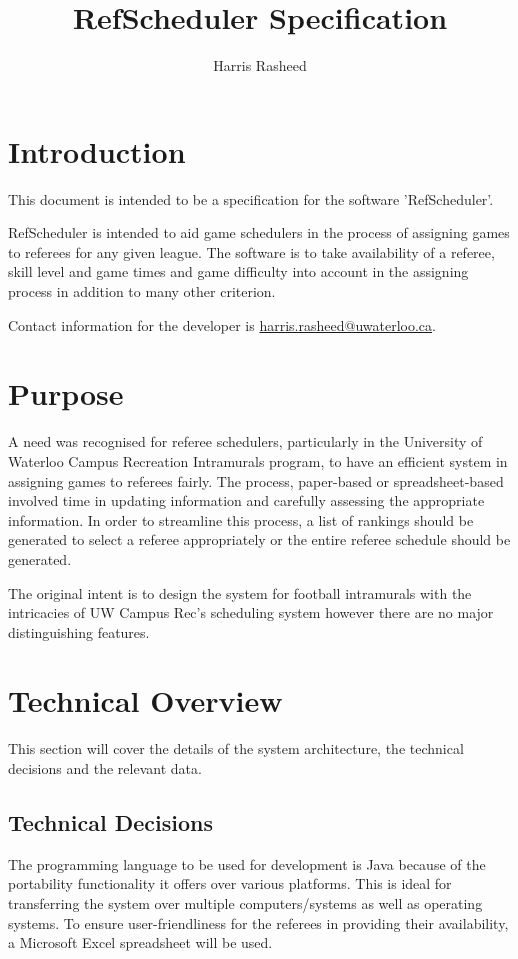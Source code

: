 \documentclass{article}
\begin{document}
\author{Harris Rasheed}
\title{RefScheduler Specification}
\maketitle

\tableofcontents
\pagebreak

\section{Introduction}
This document is intended to be a specification for the software 'RefScheduler'.

RefScheduler is intended to aid game schedulers in the process of assigning games to referees for any given league. The software is to take availability of a referee, skill level and game times and game difficulty into account in the assigning process in addition to many other criterion.

Contact information for the developer is \href{mailto:harris.rasheed@uwaterloo.ca}{harris.rasheed@uwaterloo.ca}.

\section{Purpose}
A need was recognised for referee schedulers, particularly in the University of Waterloo Campus Recreation Intramurals program, to have an efficient system in assigning games to referees fairly. The process, paper-based or spreadsheet-based involved time in updating information and carefully assessing the appropriate information. In order to streamline this process, a list of rankings should be generated to select a referee appropriately or the entire referee schedule should be generated.

The original intent is to design the system for football intramurals with the intricacies of UW Campus Rec's scheduling system however there are no major distinguishing features.

\section{Technical Overview}
This section will cover the details of the system architecture, the technical decisions and the relevant data.

\subsection{Technical Decisions}
The programming language to be used for development is Java because of the portability functionality it offers over various platforms. This is ideal for transferring the system over multiple computers/systems as well as operating systems. To ensure user-friendliness for the referees in providing their availability, a Microsoft Excel spreadsheet will be used.
\end{document}
